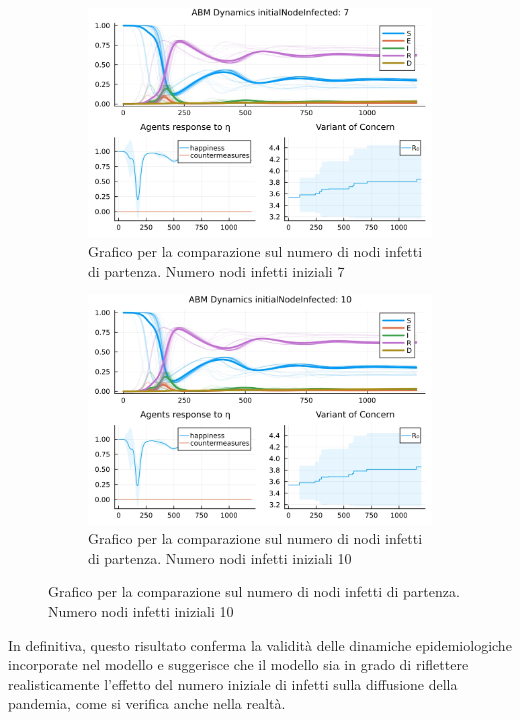 \begin{figure}[!hb]
\begin{subfigure}[b]{0.45\textwidth}
		\includegraphics[width=\textwidth]{img/SocialNetworkABM_3_II.jpg}
		\caption{Grafico per la comparazione sul numero di nodi infetti di partenza. Numero nodi infetti iniziali 7}
		\label{fig:comparison_init_node_inf_7}
	\end{subfigure}
	\hfill
	\begin{subfigure}[b]{0.45\textwidth}
		\centering
		\includegraphics[width=\textwidth]{img/SocialNetworkABM_4_II.jpg}
		\caption{Grafico per la comparazione sul numero di nodi infetti di partenza. Numero nodi infetti iniziali 10}
		\label{fig:comparison_init_node_inf_10}
	\end{subfigure}
\end{figure}

In definitiva, questo risultato conferma la validità delle dinamiche 
epidemiologiche incorporate nel modello e suggerisce che il modello sia 
in grado di riflettere realisticamente l'effetto del numero iniziale di 
infetti sulla diffusione della pandemia, come si verifica anche nella 
realtà.
\newpage

